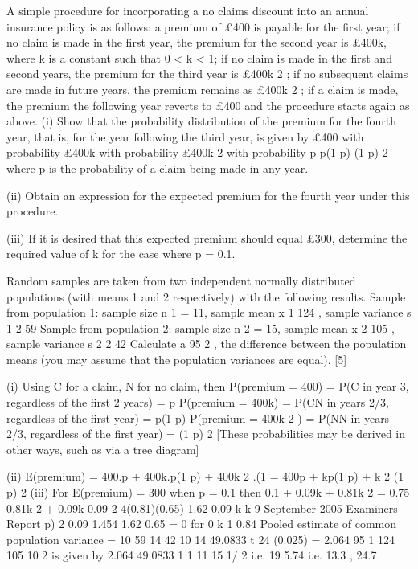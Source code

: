 

A simple procedure for incorporating a no claims discount into an annual insurance
policy is as follows:
a premium of £400 is payable for the first year;
if no claim is made in the first year, the premium for the second year is £400k,
where k is a constant such that 0 < k < 1;
if no claim is made in the first and second years, the premium for the third
year is £400k 2 ;
if no subsequent claims are made in future years, the premium remains as
£400k 2 ;
if a claim is made, the premium the following year reverts to £400 and the
procedure starts again as above.
(i)
Show that the probability distribution of the premium for the fourth year, that is, for the year following the third year, is given by
£400
with probability
£400k with probability
£400k 2 with probability
p
p(1 p)
(1 p) 2
where p is the probability of a claim being made in any year.

(ii) Obtain an expression for the expected premium for the fourth year under this procedure.

(iii) If it is desired that this expected premium should equal £300, determine the required value of k for the case where p = 0.1.

Random samples are taken from two independent normally distributed populations
(with means 1 and 2 respectively) with the following results.
Sample from population 1:
sample size n 1 = 11, sample mean x 1 124 , sample variance s 1 2
59
Sample from population 2:
sample size n 2 = 15, sample mean x 2 105 , sample variance s 2 2
42
Calculate a 95%
2 , the difference between the
population means (you may assume that the population variances are equal).
[5]

(i) Using C for a claim, N for no claim, then
P(premium = 400) = P(C in year 3, regardless of the first 2 years) = p
P(premium = 400k) = P(CN in years 2/3, regardless of the first year) = p(1 p)
P(premium = 400k 2 ) = P(NN in years 2/3, regardless of the first year) = (1 p) 2
[These probabilities may be derived in other ways, such as via a tree diagram]

(ii) E(premium) = 400.p + 400k.p(1 p) + 400k 2 .(1
= 400{p + kp(1 p) + k 2 (1 p) 2 }
(iii) For E(premium) = 300 when p = 0.1
then 0.1 + 0.09k + 0.81k 2 = 0.75
0.81k 2 + 0.09k
0.09 2 4(0.81)(0.65)
1.62
0.09
k
k
9
September 2005
Examiners Report
p) 2
0.09 1.454
1.62
0.65 = 0
for 0 k 1
0.84
Pooled estimate of common population variance =
10 59
14 42
10 14
49.0833
t 24 (0.025) = 2.064
95%
1
124 105
10
2
is given by
2.064
49.0833
1 1
11 15
1/ 2
i.e. 19 5.74 i.e. 13.3 , 24.7

